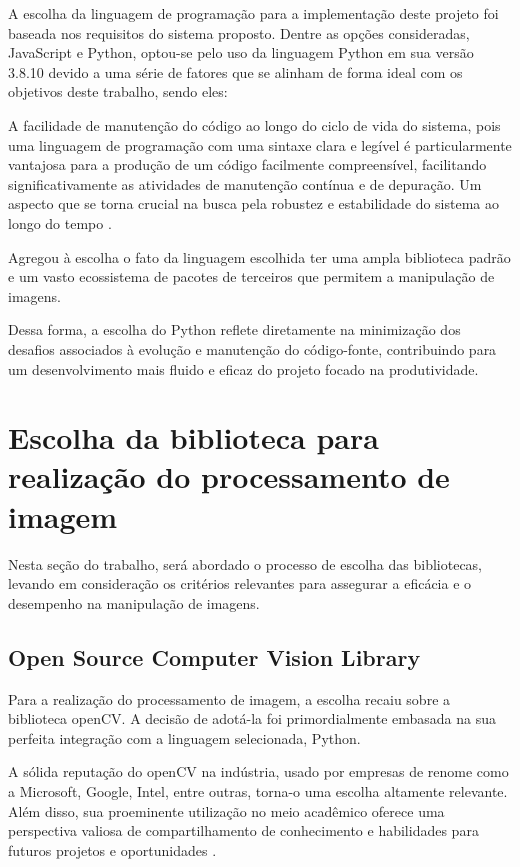 A escolha da linguagem de programação para a implementação deste projeto foi baseada nos requisitos do sistema proposto. Dentre as opções consideradas, JavaScript e Python, optou-se pelo uso da linguagem Python em sua versão 3.8.10 devido a uma série de fatores que se alinham de forma ideal com os objetivos deste trabalho, sendo eles:

A facilidade de manutenção do código ao longo do ciclo de vida do sistema, pois uma linguagem de programação com uma sintaxe clara e legível é particularmente vantajosa para a produção de um código facilmente compreensível, facilitando significativamente as atividades de manutenção contínua e de depuração. Um aspecto que se torna crucial na busca pela robustez e estabilidade do sistema ao longo do tempo \cite{clean_code}.

Agregou à escolha o fato da linguagem escolhida ter uma ampla biblioteca padrão e um vasto ecossistema de pacotes de terceiros que permitem a manipulação de imagens.

Dessa forma, a escolha do Python reflete diretamente na minimização dos desafios associados à evolução e manutenção do código-fonte, contribuindo para um desenvolvimento mais fluido e eficaz do projeto focado na produtividade.



\section[Escolha da biblioteca para realização do processamento de imagem]{Escolha da biblioteca para realização do processamento de imagem}\label{sec:Escolha da biblioteca para realizacao do processamento de imagem}

Nesta seção do trabalho, será abordado o processo de escolha das bibliotecas, levando em consideração os critérios relevantes para assegurar a eficácia e o desempenho na manipulação de imagens.

\subsection{Open Source Computer Vision Library}
Para a realização do processamento de imagem, a escolha recaiu sobre a biblioteca \ac{openCV}. A decisão de adotá-la foi primordialmente embasada na sua perfeita integração com a linguagem selecionada, Python.

A sólida reputação do \ac{openCV} na indústria, usado por empresas de renome como a Microsoft, Google, Intel, entre outras, torna-o uma escolha altamente relevante. Além disso, sua proeminente utilização no meio acadêmico oferece uma perspectiva valiosa de compartilhamento de conhecimento e habilidades para futuros projetos e oportunidades \cite{opencv_docs}. 

